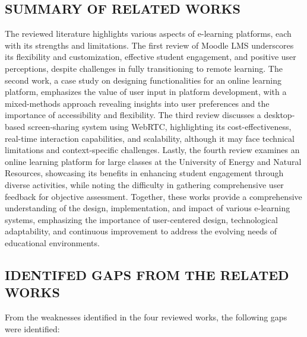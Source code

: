 \documentclass[a4paper,12pt]{article}  %
\begin{document}
\subsection{SUMMARY OF RELATED WORKS}
The reviewed literature highlights various aspects of e-learning platforms,
each with its strengths and limitations. The first review of Moodle LMS
underscores its flexibility and customization, effective student engagement,
and positive user perceptions, despite challenges in fully transitioning to
remote learning. The second work, a case study on designing functionalities for
an online learning platform, emphasizes the value of user input in platform
development, with a mixed-methods approach revealing insights into user
preferences and the importance of accessibility and flexibility. The third
review discusses a desktop-based screen-sharing system using WebRTC,
highlighting its cost-effectiveness, real-time interaction capabilities, and
scalability, although it may face technical limitations and context-specific
challenges. Lastly, the fourth review examines an online learning platform for
large classes at the University of Energy and Natural Resources, showcasing its
benefits in enhancing student engagement through diverse activities, while
noting the difficulty in gathering comprehensive user feedback for objective
assessment. Together, these works provide a comprehensive understanding of the
design, implementation, and impact of various e-learning systems, emphasizing
the importance of user-centered design, technological adaptability, and
continuous improvement to address the evolving needs of educational
environments.\\

\subsection{IDENTIFED GAPS FROM THE RELATED WORKS}
From the weaknesses identified in the four reviewed works, the following gaps
were identified:\\
\end{document}

